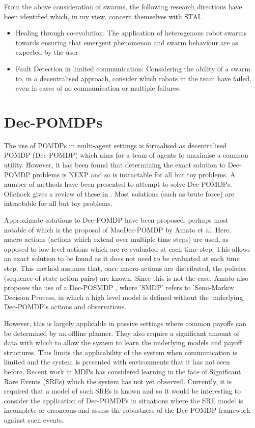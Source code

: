 \documentclass[preprint,8pt]{report}
\begin{document}
From the above consideration of swarms, the following research directions have been identified which, in my view, concern themselves with STAI.

\begin{itemize}
    \item Healing through co-evolution: The application of heterogenous robot swarms towards ensuring that emergent phenomenon and swarm behaviour are as expected by the user.
    \item Fault Detection in limited communication: Considering the ability of a swarm to, in a decentralised approach, consider which robots in the team have failed, even in cases of no communication or multiple failures.
\end{itemize}

\section{Dec-POMDPs}

The use of POMDPs in multi-agent settings is formalised as decentralised POMDP (Dec-POMDP) which aims for a team of agents to maximise a common utility. However, it has been found that determining the exact solution to Dec-POMDP problems is NEXP \cite{Eker2011} and so is intractable for all but toy problems. A number of methods have been presented to attempt to solve Dec-POMDPs. Oliehoek gives a review of these in \cite{OliehoekDecentralizedPOMDPs}. Most solutions (such as brute force) are intractable for all but toy problems. 

Approximate solutions to Dec-POMDP have been proposed, perhaps most notable of which is the proposal of MacDec-POMDP \cite{Amato2015} by Amato et al. Here, macro actions (actions which extend over multiple time steps) are used, as opposed to low-level actions which are re-evaluated at each time step. This allows an exact solution to be found as it does not need to be evaluated at each time step. This method assumes that, once macro-actions are distributed, the policies (sequence of state-action pairs) are known. Since this is not the case, Amato also proposes the use of a Dec-POSMDP \cite{Amato2017Decision-MakingLearning}, where 'SMDP' refers to 'Semi-Markov Decision Process, in which a high level model is defined without the underlying Dec-POMDP's actions and observations.

However, this is largely applicable in passive settings where common payoffs can be determined by an offline planner. They also require a significant amount of data with which to allow the system to learn the underlying models and payoff structures. This limits the applicability of the system when communication is limited and the system is presented with environments that it has not seen before. Recent work in MDPs \cite{Klima2019RobustDomains} has considered learning in the face of Significant Rare Events (SREs) which the system has not yet observed. Currently, it is required that a model of such SREs is known and so it would be interesting to consider the application of Dec-POMDPs in situations where the SRE model is incomplete or erroneous and assess the robustness of the Dec-POMDP framework against such events. 
\end{document}
